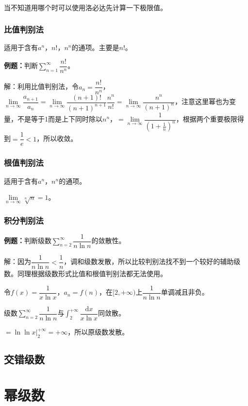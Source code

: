 当不知道用哪个时可以使用洛必达先计算一下极限值。

\subsubsection{比值判别法}

适用于含有$a^n$，$n!$，$n^n$的通项。主要是$n!$。

\textbf{例题：}判断$\sum\limits_{n=1}^\infty\dfrac{n!}{n^n}$。

解：利用比值判别法，令$a_n=\dfrac{n!}{n^n}$，$\lim\limits_{n\to\infty}\dfrac{a_{n+1}}{a_n}=\lim\limits_{n\to\infty}\dfrac{(n+1)!}{(n+1)^{n+1}}\dfrac{n^n}{n!}=\lim\limits_{n\to\infty}\dfrac{n^n}{(n+1)^n}$，注意这里幂也为变量，不是等于1而是上下同时除以$n^n$，$=\lim\limits_{n\to\infty}\dfrac{1}{(1+\frac{1}{n})^n}$，根据两个重要极限得到$=\dfrac{1}{e}<1$，所以收敛。

\subsubsection{根值判别法}

适用于含有$a^n$，$n^n$的通项。

$\lim\limits_{n\to\infty}\sqrt[n]{n}=1$。

\subsubsection{积分判别法}

\textbf{例题：}判断级数$\sum\limits_{n=2}^\infty\dfrac{1}{n\ln n}$的敛散性。

解：因为$\dfrac{1}{n\ln n}<\dfrac{1}{n}$，调和级数发散，所以比较判别法找不到一个较好的辅助级数。同理根据级数形式比值和根值判别法都无法使用。

令$f(x)=\dfrac{1}{x\ln x}$，$a_n=f(n)$，在$[2,+\infty)$上$\dfrac{1}{n\ln n}$单调减且非负。

级数$\sum\limits_{n=2}^\infty\dfrac{1}{n\ln n}$与$\int_2^{+\infty}\dfrac{\textrm{d}x}{x\ln x}$同敛散。

$=\ln\ln x\vert_2^{+\infty}=+\infty$，所以原级数发散。

\subsection{交错级数}

\section{幂级数}

